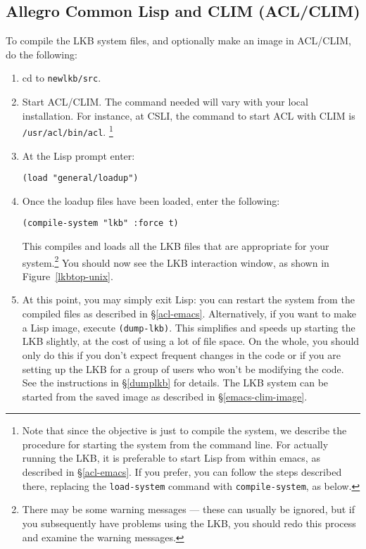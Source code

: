 \documentclass[12pt]{report}
\begin{document}
\subsection{Allegro Common Lisp and CLIM (ACL/CLIM)}
\label{acl-src}

To compile the LKB system files, and optionally make an image
in ACL/CLIM, do the following:
\begin{enumerate}
\item cd to \verb+newlkb/src+.  
\item Start ACL/CLIM.  The command needed will vary with your local
installation.  For instance,
at CSLI, the command to start ACL with CLIM is \verb+/usr/acl/bin/acl+.
\footnote{Note that since the objective is just to compile the system,
we describe the procedure for
starting the system from the command line.  For actually running the LKB,
it is preferable to start Lisp from within emacs, as described
in \S\ref{acl-emacs}.  If you prefer, you can follow the steps described
there, replacing the {\tt load-system} command with {\tt compile-system},
as below.}
\item At the Lisp prompt enter:
\begin{verbatim}
(load "general/loadup") 
\end{verbatim}
\item Once the loadup files have been loaded, enter the following:
\begin{verbatim}
(compile-system "lkb" :force t)
\end{verbatim}
This compiles and loads all the LKB files that are appropriate for
your system.\footnote{There may be
some warning messages --- these can usually be ignored, but if you subsequently
have problems using the LKB, you should redo this process
and examine the warning messages.}
You
should now see the LKB interaction window, as shown in 
Figure~\ref{lkbtop-unix}.
\item At this point, you may simply exit Lisp:
you can restart the system from the compiled files
as described in \S\ref{acl-emacs}.
Alternatively, if you want to make a Lisp image, execute \verb+(dump-lkb)+.
This simplifies and speeds up starting the LKB slightly, at the cost of
using a lot of file space.
On the whole, you should only do this if you don't expect
frequent changes in the code or if you are setting up the LKB for
a group of users who won't be modifying the code.
See the instructions in \S\ref{dumplkb} for details.
The LKB system can be started from the saved image as described in 
\S\ref{emacs-clim-image}.
\end{enumerate}
\end{document}
